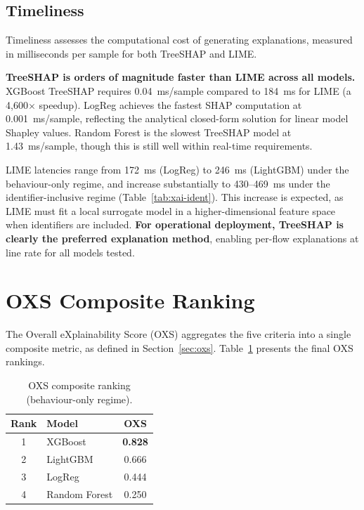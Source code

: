 \documentclass[12pt,a4paper]{report}
\begin{document}
\subsection{Timeliness}
\label{sec:time-results}

Timeliness assesses the computational cost of generating explanations, measured in milliseconds per sample for both TreeSHAP and LIME.

\textbf{TreeSHAP is orders of magnitude faster than LIME across all models.} XGBoost TreeSHAP requires 0.04~ms/sample compared to 184~ms for LIME (a 4,600$\times$ speedup). LogReg achieves the fastest SHAP computation at 0.001~ms/sample, reflecting the analytical closed-form solution for linear model Shapley values. Random Forest is the slowest TreeSHAP model at 1.43~ms/sample, though this is still well within real-time requirements.

LIME latencies range from 172~ms (LogReg) to 246~ms (LightGBM) under the behaviour-only regime, and increase substantially to 430--469~ms under the identifier-inclusive regime (Table~\ref{tab:xai-ident}). This increase is expected, as LIME must fit a local surrogate model in a higher-dimensional feature space when identifiers are included. \textbf{For operational deployment, TreeSHAP is clearly the preferred explanation method}, enabling per-flow explanations at line rate for all models tested.

\section{OXS Composite Ranking}
\label{sec:oxs-results}

The Overall eXplainability Score (OXS) aggregates the five criteria into a single composite metric, as defined in Section~\ref{sec:oxs}. Table~\ref{tab:oxs} presents the final OXS rankings.

\begin{table}[H]
\centering
\caption{OXS composite ranking (behaviour-only regime).}
\label{tab:oxs}
\begin{tabular}{clc}
\toprule
\textbf{Rank} & \textbf{Model} & \textbf{OXS} \\
\midrule
1 & XGBoost & \textbf{0.828} \\
2 & LightGBM & 0.666 \\
3 & LogReg & 0.444 \\
4 & Random Forest & 0.250 \\
\bottomrule
\end{tabular}
\end{table}
\end{document}
